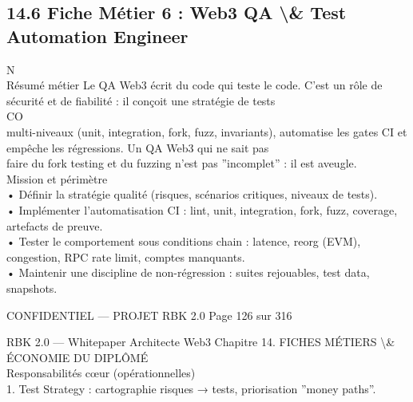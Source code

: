\documentclass[12pt,landscape,a4paper]{article}
\newenvironment{confidential}
{\begin{tcolorbox}[
    colback=rbkred!5!white,
    colframe=rbkred!75!black,
    title=CONFIDENTIEL,
    fonttitle=\bfseries\color{white},
    coltitle=rbkred!75!black,
    breakable,
    enhanced,
    frame hidden,
    borderline west={2pt}{0pt}{rbkred!75!black}
]}
{\end{tcolorbox}}
\begin{document}
\subsection{14.6 Fiche Métier 6 : Web3 QA \textbackslash{}& Test Automation Engineer}
\vspace{0.5em}
N\\
Résumé métier Le QA Web3 écrit du code qui teste le code. C’est un rôle de sécurité et de fiabilité : il conçoit une stratégie de tests\\
CO\\
multi-niveaux (unit, integration, fork, fuzz, invariants), automatise les gates CI et empêche les régressions. Un QA Web3 qui ne sait pas\\
faire du fork testing et du fuzzing n’est pas ”incomplet” : il est aveugle.\\
\vspace{0.5em}
Mission et périmètre\\
\vspace{0.5em}
• Définir la stratégie qualité (risques, scénarios critiques, niveaux de tests).\\
\vspace{0.5em}
• Implémenter l’automatisation CI : lint, unit, integration, fork, fuzz, coverage, artefacts de preuve.\\
\vspace{0.5em}
• Tester le comportement sous conditions chain : latence, reorg (EVM), congestion, RPC rate limit, comptes manquants.\\
\vspace{0.5em}
• Maintenir une discipline de non-régression : suites rejouables, test data, snapshots.\\
\vspace{0.5em}
\vspace{0.5em}
\begin{confidential}CONFIDENTIEL — PROJET RBK 2.0                                  Page 126 sur 316\end{confidential}
RBK 2.0 — Whitepaper Architecte Web3                                                  Chapitre 14. FICHES MÉTIERS \textbackslash{}& ÉCONOMIE DU DIPLÔMÉ\\
\vspace{0.5em}
\vspace{0.5em}
Responsabilités cœur (opérationnelles)\\
1. Test Strategy : cartographie risques → tests, priorisation ”money paths”.\\
\vspace{0.5em}
\end{document}
